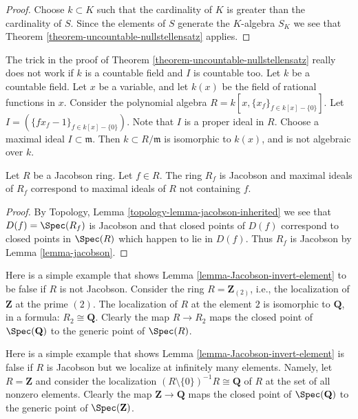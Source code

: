 \begin{proof}
Choose $k \subset K$ such that the cardinality of $K$ is greater
than the cardinality of $S$. Since the elements of $S$ generate
the $K$-algebra $S_K$ we see that
Theorem \ref{theorem-uncountable-nullstellensatz}
applies.
\end{proof}

\begin{example}
\label{example-countable-trick-does-not-work}
The trick in the proof of
Theorem \ref{theorem-uncountable-nullstellensatz}
really does not work if $k$ is a countable field and $I$ is countable too.
Let $k$ be a countable field. Let $x$ be a variable,
and let $k(x)$ be the field of rational functions in $x$.
Consider the polynomial algebra $R = k[x, \{x_f\}_{f \in k[x]-\{0\}}]$.
Let $I = (\{fx_f - 1\}_{f\in k[x] - \{0\}})$. Note that
$I$ is a proper ideal in $R$.
Choose a maximal ideal $I \subset \mathfrak m$.
Then $k \subset R/\mathfrak m$ is isomorphic to
$k(x)$, and is not algebraic over $k$.
\end{example}

\begin{lemma}
\label{lemma-Jacobson-invert-element}
Let $R$ be a Jacobson ring. Let $f \in R$. The ring $R_f$ is Jacobson and
maximal ideals of $R_f$ correspond to maximal ideals of $R$ not containing $f$.
\end{lemma}

\begin{proof}
By Topology, Lemma \ref{topology-lemma-jacobson-inherited}
we see that $D(f) = \Spec(R_f)$ is Jacobson and
that closed points of $D(f)$
correspond to closed points in $\Spec(R)$
which happen to lie in $D(f)$. Thus $R_f$ is Jacobson by
Lemma \ref{lemma-jacobson}.
\end{proof}

\begin{example}
\label{example-localize-not-preserve-closed-points}
Here is a simple example that shows Lemma \ref{lemma-Jacobson-invert-element}
to be false if $R$ is not Jacobson.
Consider the ring $R = \mathbf{Z}_{(2)}$, i.e., the localization
of $\mathbf{Z}$ at the prime $(2)$. The localization of $R$ at
the element $2$ is isomorphic to $\mathbf{Q}$, in a formula:
$R_2 \cong \mathbf{Q}$. Clearly the map $R \to R_2$ maps the
closed point of $\Spec(\mathbf{Q})$ to the generic point
of $\Spec(R)$.
\end{example}

\begin{example}
\label{example-infinite-localize-not-preserve-closed-points}
Here is a simple example that shows
Lemma \ref{lemma-Jacobson-invert-element}
is false if $R$ is Jacobson but we localize at infinitely
many elements.
Namely, let $R = \mathbf{Z}$ and consider the localization
$(R \setminus \{0\})^{-1}R \cong \mathbf{Q}$
of $R$ at the set of all nonzero elements.
Clearly the map $\mathbf{Z} \to \mathbf{Q}$ maps the
closed point of $\Spec(\mathbf{Q})$ to the generic point
of $\Spec(\mathbf{Z})$.
\end{example}

